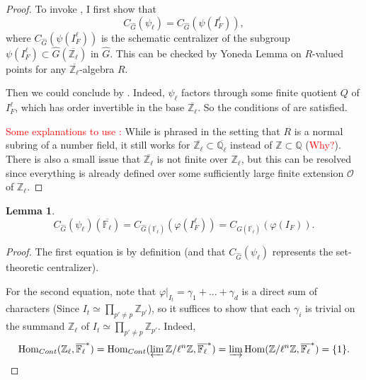 \documentclass{article}
\newcommand{\red}[1]{\textcolor{red}{#1}}
\newtheorem{lemma}{Lemma}
\newcommand{\Hom}{\operatorname{Hom}}
\begin{document}
\begin{proof}
	To invoke \cite[Lemma 3.2]{dat2022ihes}, I first show that $$C_{\hat{G}}(\psi_{\ell})=C_{\hat{G}}(\psi(I_F^{\ell})),$$
	where $C_{\hat{G}}(\psi(I_F^{\ell}))$ is the schematic centralizer of the subgroup $\psi(I_F^{\ell}) \subset \hat{G}(\overline{\mathbb{Z}_{\ell}})$ in $\hat{G}$. This can be checked by Yoneda Lemma on $R$-valued points for any $\overline{\mathbb{Z}_{\ell}}$-algebra $R$.
	
	Then we could conclude by \cite[Lemma 3.2]{dat2022ihes}. Indeed, $\psi_{\ell}$ factors through some finite quotient $Q$ of $I_F^{\ell}$, which has order invertible in the base $\overline{\mathbb{Z}_{\ell}}$. So the conditions of \cite[Lemma 3.2]{dat2022ihes} are satisfied. 
	
	\red{Some explanations to use \cite[Lemma 3.2]{dat2022ihes}: } While \cite[Lemma 3.2]{dat2022ihes} is phrased in the setting that $R$ is a normal subring of a number field, it still works for $\overline{\mathbb{Z}_{\ell}} \subset \overline{\mathbb{Q}_{\ell}}$ instead of $\mathbb{Z} \subset \mathbb{Q}$ (\red{Why?}). There is also a small issue that $\overline{\mathbb{Z}_{\ell}}$ is not finite over $\mathbb{Z}_{\ell}$, but this can be resolved since everything is already defined over some sufficiently large finite extension $\mathcal{O}$ of $\mathbb{Z}_{\ell}$.
\end{proof}

\begin{lemma}\label{Lem I_F^ell}
	$$C_{\hat{G}}(\psi_{\ell})(\overline{\mathbb{F}_{\ell}})=C_{\hat{G}(\overline{\mathbb{F}_{\ell}})}(\varphi(I_F^\ell))=C_{\hat{G}(\overline{\mathbb{F}_{\ell}})}(\varphi(I_F)).$$
\end{lemma}

\begin{proof}
	The first equation is by definition (and that $C_{\hat{G}}(\psi_{\ell})$ represents the set-theoretic centralizer).
	
	For the second equation, note that $\varphi|_{I_t}=\gamma_1 + ...+ \gamma_d$ is a direct sum of characters (Since $I_t \simeq \prod_{p'\neq p}\mathbb{Z}_{p'}$), so it suffices to show that each $\gamma_i$ is trivial on the summand $\mathbb{Z}_{\ell}$ of $I_t\simeq \prod_{p'\neq p}\mathbb{Z}_{p'}$.
	Indeed,
	$$\Hom_{Cont}(\mathbb{Z}_{\ell}, \overline{\mathbb{F}_{\ell}}^*)=\Hom_{Cont}(\varprojlim\mathbb{Z}/\ell^n\mathbb{Z}, \overline{\mathbb{F}_{\ell}}^*)=\varinjlim\Hom(\mathbb{Z}/\ell^n\mathbb{Z}, \overline{\mathbb{F}_{\ell}}^*)=\{1\}.$$
\end{proof}
\end{document}
